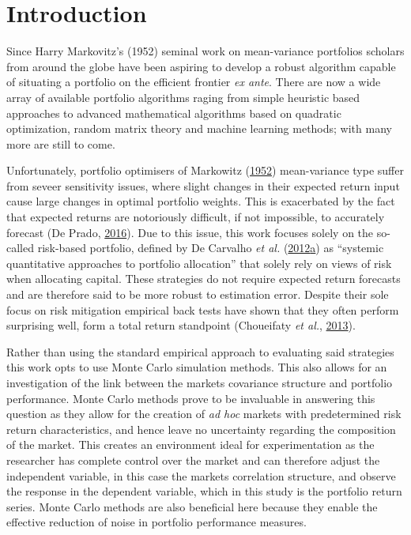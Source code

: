 \documentclass[11pt,preprint, authoryear]{elsarticle}
\numberwithin{equation}{section}
\numberwithin{figure}{section}
\numberwithin{table}{section}
\begin{document}
\headsep 35pt %




\hypertarget{introduction}{%
\section{\texorpdfstring{Introduction
\label{Introduction}}{Introduction }}\label{introduction}}

Since Harry Markovitz's (1952) seminal work on mean-variance portfolios
scholars from around the globe have been aspiring to develop a robust
algorithm capable of situating a portfolio on the efficient frontier
\emph{ex ante}. There are now a wide array of available portfolio
algorithms raging from simple heuristic based approaches to advanced
mathematical algorithms based on quadratic optimization, random matrix
theory and machine learning methods; with many more are still to come.

Unfortunately, portfolio optimisers of Markowitz
(\protect\hyperlink{ref-markowitz}{1952}) mean-variance type suffer from
seveer sensitivity issues, where slight changes in their expected return
input cause large changes in optimal portfolio weights. This is
exacerbated by the fact that expected returns are notoriously difficult,
if not impossible, to accurately forecast (De Prado,
\protect\hyperlink{ref-lopez}{2016}). Due to this issue, this work
focuses solely on the so-called risk-based portfolio, defined by De
Carvalho \emph{et al.}
(\protect\hyperlink{ref-leote}{2012}\protect\hyperlink{ref-leote}{a}) as
``systemic quantitative approaches to portfolio allocation'' that solely
rely on views of risk when allocating capital. These strategies do not
require expected return forecasts and are therefore said to be more
robust to estimation error. Despite their sole focus on risk mitigation
empirical back tests have shown that they often perform surprising well,
form a total return standpoint (Choueifaty \emph{et al.},
\protect\hyperlink{ref-choueifaty2013}{2013}).

Rather than using the standard empirical approach to evaluating said
strategies this work opts to use Monte Carlo simulation methods. This
also allows for an investigation of the link between the markets
covariance structure and portfolio performance. Monte Carlo methods
prove to be invaluable in answering this question as they allow for the
creation of \emph{ad hoc} markets with predetermined risk return
characteristics, and hence leave no uncertainty regarding the
composition of the market. This creates an environment ideal for
experimentation as the researcher has complete control over the market
and can therefore adjust the independent variable, in this case the
markets correlation structure, and observe the response in the dependent
variable, which in this study is the portfolio return series. Monte
Carlo methods are also beneficial here because they enable the effective
reduction of noise in portfolio performance measures.
\end{document}

